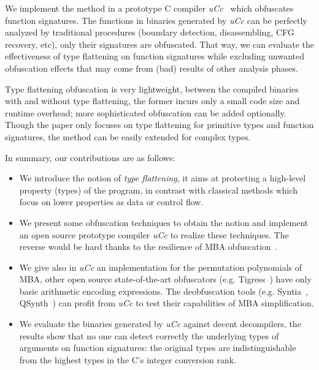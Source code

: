 \documentclass[compsoc,conference,a4paper,10pt,times]{IEEEtran}
\begin{document}
We implement the method in a prototype C compiler \emph{uCc}~\cite{ta_ucc_nodate} which obfuscates
function signatures. The functions in binaries generated by \emph{uCc} can be
perfectly analyzed by traditional procedures (boundary detection, disassembling, CFG recovery, etc),
only their signatures are obfuscated. That way, we can evaluate the effectiveness of type
flattening on function signatures while excluding unwanted obfuscation effects that may come from (bad) results
of other analysis phases.

Type flattening obfuscation is very lightweight, between the compiled binaries with and without type
flattening, the former incurs only a small code size and runtime overhead; more sophisticated obfuscation
can be added optionally. Though the paper only focuses on type flattening for primitive types and function
signatures, the method can be easily extended for complex types.

In summary, our contributions are as follows:
\begin{itemize}
  \item We introduce the notion of \emph{type flattening}, it aims at protecting a high-level
  property (types) of the program, in contrast with classical methods which focus on lower
  properties as data or control flow.

  \item We present some obfuscation techniques to obtain the notion and implement an open source prototype
  compiler \emph{uCc} to realize these techniques.
  The reverse would be hard thanks to the resilience of MBA obfuscation~\cite{eyrolles_defeating_2016,biondi_effectiveness_2017}.

  \item We give also in \emph{uCc} an implementation for the permutation polynomials
  of MBA, other open source state-of-the-art obfuscators
  (e.g. Tigress~\cite{noauthor_tigress_nodate}) have only basic arithmetic encoding expressions.
  The deobfuscation tools (e.g. Syntia~\cite{blazytko_syntia_2017}, QSynth~\cite{david_qsynth_2020})
  can profit from \emph{uCc} to test their capabilities of MBA simplification.

  \item We evaluate the binaries generated by \emph{uCc} against decent decompilers, the results
  show that no one can detect correctly the underlying types of arguments on function signatures: the
  original types are indistinguishable from the highest types in the C's integer conversion rank.
\end{itemize}
\end{document}
